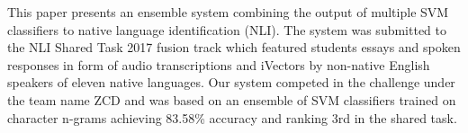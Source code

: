 This paper presents an ensemble system combining the output of multiple SVM classifiers to native language identification (NLI). The system was submitted to the NLI Shared Task 2017 fusion track which featured students essays and spoken responses in form of audio transcriptions and iVectors by non-native English speakers of eleven native languages. Our system competed in the challenge under the team name ZCD and was based on an ensemble of SVM classifiers trained on character n-grams achieving 83.58\% accuracy and ranking 3rd in the shared task.
